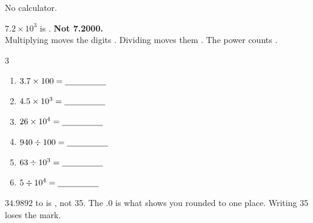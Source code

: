 \documentclass[12pt,a4paper]{article}
\begin{document}
\begin{workspace}[2.3cm]\end{workspace}



\noindent No calculator.

\begin{remember}
  $7.2 \times 10^3$ is . \; {\color{cbred}\bfseries Not 7.2000.} \\
  Multiplying moves the digits . Dividing moves them . The
  power counts .
\end{remember}

\vspace{2pt}
\begin{multicols}{3}
\begin{enumerate}[label=(\alph*), itemsep=10pt]
  \item $3.7 \times 100 = \blank[1.7cm]$
  \item $4.5 \times 10^3 = \blank[1.7cm]$
  \item $26 \times 10^4 = \blank[1.7cm]$
  \item $940 \div 100 = \blank[1.7cm]$
  \item $63 \div 10^3 = \blank[1.7cm]$
  \item $5 \div 10^4 = \blank[1.7cm]$
\end{enumerate}
\end{multicols}


\begin{remember}
  $34.9892$ to  is , not 35. The $.0$ is what shows
  you rounded to one place. Writing 35 loses the mark.
\end{remember}
\end{document}
